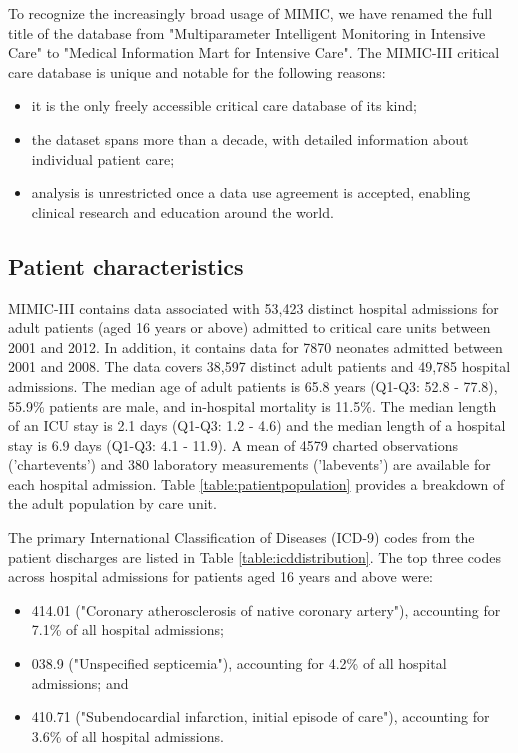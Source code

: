 \documentclass[english]{article}
\begin{document}

To recognize the increasingly broad usage of MIMIC, we have renamed the full title of the database from "Multiparameter Intelligent Monitoring in Intensive Care" to "Medical Information Mart for Intensive Care". The MIMIC-III critical care database is unique and notable for the following reasons:
\begin{itemize}
  \item it is the only freely accessible critical care database of its kind;
  \item the dataset spans more than a decade, with detailed information about individual patient care;
  \item analysis is unrestricted once a data use agreement is accepted, enabling clinical research and education around the world.
\end{itemize}

\subsection*{Patient characteristics}

MIMIC-III contains data associated with 53,423 distinct hospital admissions for adult patients (aged 16 years or above) admitted to critical care units between 2001 and 2012. In addition, it contains data for 7870 neonates admitted between 2001 and 2008. The data covers 38,597 distinct adult patients and 49,785 hospital admissions. The median age of adult patients is 65.8 years (Q1-Q3: 52.8 - 77.8), 55.9\% patients are male, and in-hospital mortality is 11.5\%. The median length of an ICU stay is 2.1 days (Q1-Q3: 1.2 - 4.6) and the median length of a hospital stay is 6.9 days (Q1-Q3: 4.1 - 11.9). A mean of 4579 charted observations ('chartevents') and 380 laboratory measurements ('labevents') are available for each hospital admission. Table \ref{table:patientpopulation} provides a breakdown of the adult population by care unit.

The primary International Classification of Diseases (ICD-9) codes from the patient discharges are listed in Table \ref{table:icddistribution}. The top three codes across hospital admissions for patients aged 16 years and above were:
\begin{itemize}
\item 414.01 ("Coronary atherosclerosis of native coronary artery"), accounting for 7.1\% of all hospital admissions;
\item 038.9 ("Unspecified septicemia"), accounting for 4.2\% of all hospital admissions; and
\item 410.71 ("Subendocardial infarction, initial episode of care"), accounting for 3.6\% of all hospital admissions.
\end{itemize}
\end{document}

